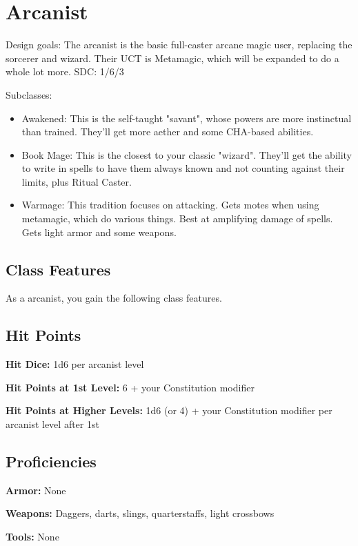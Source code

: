 \section{Arcanist}

Design goals: The arcanist is the basic full-caster arcane magic user, replacing the sorcerer and wizard. Their UCT is Metamagic, which will be expanded to do a whole lot more. SDC: 1/6/3

Subclasses:
\begin{itemize}
	\item Awakened: This is the self-taught "savant", whose powers are more instinctual than trained. They'll get more aether and some CHA-based abilities.
	\item Book Mage: This is the closest to your classic "wizard". They'll get the ability to write in spells to have them always known and not counting against their limits, plus Ritual Caster.
	\item Warmage: This tradition focuses on attacking. Gets motes when using metamagic, which do various things. Best at amplifying damage of spells. Gets light armor and some weapons.
\end{itemize}

\subsection{Class Features}

As a arcanist, you gain the following class features.

\subsection{Hit Points}

\textbf{Hit Dice:} 1d6 per arcanist level

\textbf{Hit Points at 1st Level:} 6 + your Constitution modifier

\textbf{Hit Points at Higher Levels:} 1d6 (or 4) + your Constitution modifier per arcanist level after 1st

\subsection{Proficiencies}

\textbf{Armor:} None

\textbf{Weapons:} Daggers, darts, slings, quarterstaffs, light crossbows

\textbf{Tools:} None

